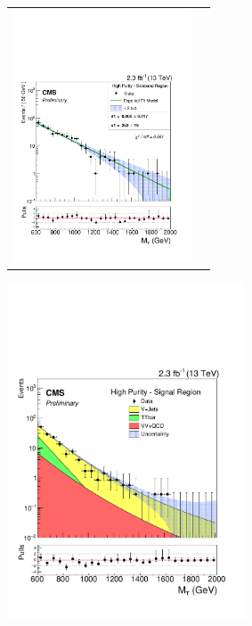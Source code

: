 \begin{figure}[!ht]
\begin{tabular}{cc}
\includegraphics[width=150pt]{figuresARC/fits/sbData_MVZHP.pdf}\\
\end{tabular}
\begin{center}
  \includegraphics[width=200pt]{figuresARC/fits/finalresultUBHP.pdf}
\end{center}
\label{fig:fits3}
\end{figure}


